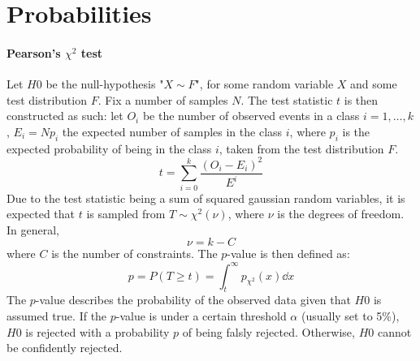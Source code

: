 \section{Probabilities}
\label{sec:pearson}

\paragraph{Pearson's \(\chi^2\) test}
Let \(H0\) be the null-hypothesis "\(X \sim F\)", for some random variable \(X\) and some test distribution \(F\). Fix a number of samples \(N\).
The test statistic \(t\) is then constructed as such: let \(O_i\) be the number of observed events in a class \(i=1,\dots,k\), \(E_i = Np_i\) the expected number of samples in the class \(i\), where \(p_i\) is the expected probability of being in the class \(i\), taken from the test distribution \(F\).
\begin{equation}
    t = \sum_{i=0}^k \frac{(O_i - E_i)^2}{E^i}
\end{equation}
Due to the test statistic being a sum of squared gaussian random variables, it is expected that \(t\) is sampled from \(T \sim \chi^2(\nu)\), where \(\nu\) is the degrees of freedom. In general,
\begin{equation}
    \nu = k-C
\end{equation} 
where \(C\) is the number of constraints. The \(p\)-value is then defined as:
\begin{equation}
    p = P(T \ge t) = \int_t^\infty p_{\chi^2}(x) \dd x
\end{equation}
The \(p\)-value describes the probability of the observed data given that \(H0\) is assumed true. If the \(p\)-value is under a certain threshold \(\alpha\) (usually set to 5\%), \(H0\) is rejected with a probability \(p\) of being falsly rejected. Otherwise, \(H0\) cannot be confidently rejected.